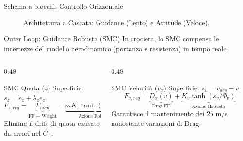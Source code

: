 \documentclass[aspectratio=169]{beamer} %
\begin{document}
\begin{frame}{Schema a blocchi: Controllo Orizzontale}
\begin{figure}[htbp]
{\begin{tikzpicture}[auto, node distance=1.3cm, >=Stealth, thick]
    \end{tikzpicture}
    }
    \caption{Architettura a Cascata: Guidance (Lento) e Attitude (Veloce).}
    \end{figure}
\end{frame}

\begin{frame}{Outer Loop: Guidance Robusta (SMC)}
    In crociera, lo SMC compensa le incertezze del modello aerodinamico (portanza e resistenza) in tempo reale.
    
    \vspace{0.3cm}
    \begin{columns}[T]
        \begin{column}{0.48\textwidth}
            \begin{block}{SMC Quota ($z$)}
                Superficie: $s_z = \dot{e}_z + \lambda_z e_z$
                \begin{equation*}
                    F_{z,req} = \underbrace{F_{nom}}_{\text{FF + Weight}} - \underbrace{m K_z \tanh(s_z/\Phi_z)}_{\text{Azione Robusta}}
                \end{equation*}
                Elimina il drift di quota causato da errori nel $C_L$.
            \end{block}
        \end{column}
        
        \begin{column}{0.48\textwidth}
            \begin{block}{SMC Velocità ($v_x$)}
                Superficie: $s_v = v_{des} - v$
                \begin{equation*}
                    F_{x,req} = \underbrace{D_{x}(v)}_{\text{Drag FF}} + \underbrace{K_v \tanh(s_v/\Phi_v)}_{\text{Azione Robusta}}
                \end{equation*}
                Garantisce il mantenimento dei $25$ m/s nonostante variazioni di Drag.
            \end{block}
        \end{column}
    \end{columns}
\end{frame}
\end{document}
